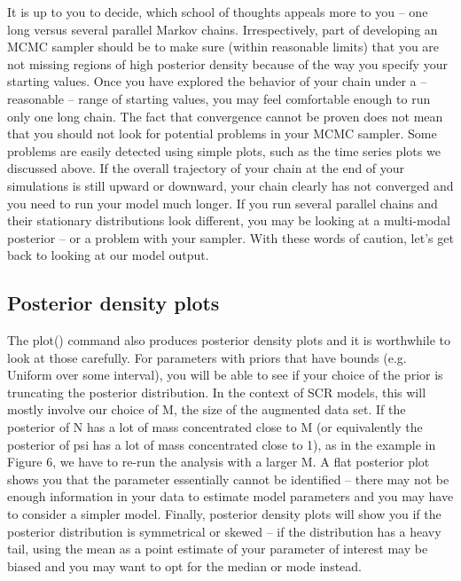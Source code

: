 It is up to you to decide, which school of thoughts appeals more to you – one long versus several parallel Markov chains. Irrespectively, part of developing an MCMC sampler should be to make sure (within reasonable limits) that you are not missing regions of high posterior density because of the way you specify your starting values. Once you have explored the behavior of your chain under a – reasonable – range of starting values, you may feel comfortable enough to run only one long chain.  
The fact that convergence cannot be proven does not mean that you should not look for potential problems in your MCMC sampler. Some problems are easily detected using simple plots, such as the time series plots we discussed above. If the overall trajectory of your chain at the end of your simulations is still upward or downward, your chain clearly has not converged and you need to run your model much longer.  If you run several parallel chains and their stationary distributions look different, you may be looking at a multi-modal posterior – or a problem with your sampler. With these words of caution, let's get back to looking at our model output.

\subsection{Posterior density plots}
The plot() command also produces posterior density plots and it is worthwhile to look at those carefully. For parameters with priors that have bounds (e.g. Uniform over some interval), you will be able to see if your choice of the prior is truncating the posterior distribution. In the context of SCR models, this will mostly involve our choice of M, the size of the augmented data set. If the posterior of N has a lot of mass concentrated close to M (or equivalently the posterior of psi has a lot of mass concentrated close to 1), as in the example in Figure 6, we have to re-run the analysis with a larger M.  A flat posterior plot shows you that the parameter essentially cannot be identified – there may not be enough information in your data to estimate model parameters and you may have to consider a simpler model. Finally, posterior density plots will show you if the posterior distribution is symmetrical or skewed – if the distribution has a heavy tail, using the mean as a point estimate of your parameter of interest may be biased and you may want to opt for the median or mode instead. 


